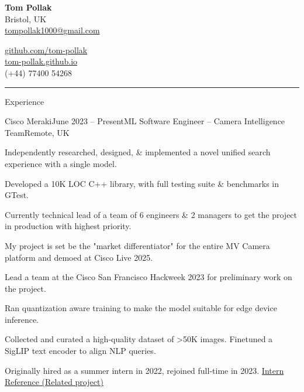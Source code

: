 \documentclass{structure}
\begin{document}
\parbox{0.5\textwidth}{
    {\namesize\textbf{Tom Pollak}} \\[6pt]
    Bristol, UK\\
    \href{mailto:tompollak1000@gmail.com}{tompollak1000@gmail.com}
}
\hfill
\parbox{0.5\textwidth}{
    \vspace*{10pt}

    \begin{flushright}

        \href{https://github.com/tom-pollak}{github.com/tom-pollak} \\
        \href{https://tom-pollak.github.io}{tom-pollak.github.io} \\
        (+44) 77400 54268
    \end{flushright}

}

\smallskip
\hrule
\smallskip


\begin{rSection}{Experience}

    \begin{rSubsection}{Cisco Meraki}{June 2023 -- Present}{ML Software Engineer -- Camera Intelligence Team}{Remote, UK}{}{}
        \item Independently researched, designed, \& implemented a novel unified search experience with a single model.
        \item Developed a 10K LOC C++ library, with full testing suite \& benchmarks in GTest.
        \item Currently technical lead of a team of 6 engineers \& 2 managers to get the project in production with highest priority.
        \item My project is set be the "market differentiator" for the entire MV Camera platform and demoed at Cisco Live 2025.
        \item Lead a team at the Cisco San Francisco Hackweek 2023 for preliminary work on the project.
        \item Ran quantization aware training to make the model suitable for edge device inference.
        \item Collected and curated a high-quality dataset of >50K images. Finetuned a SigLIP text encoder to align NLP queries.
        \item Originally hired as a summer intern in 2022, rejoined full-time in 2023. \href{https://gist.githubusercontent.com/tom-pollak/1a2e8c1fc61ba269e25c73c02c78007c/raw/45c8cbceda8cd745d6d00cb16a09979778df663b/gistfile1.txt}{{\color{blue}Intern Reference} (Related project)}
    \end{rSubsection}

\end{rSection}
\end{document}
